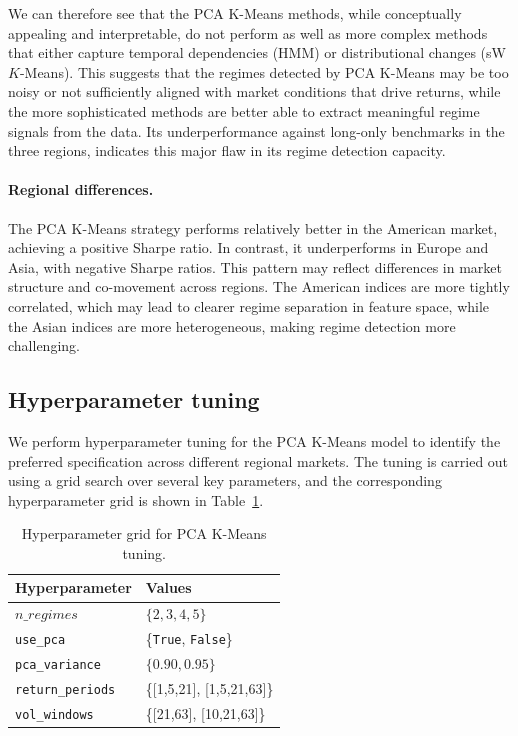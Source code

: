 \documentclass[11pt, a4paper]{article}
\begin{document}
We can therefore see that the PCA K-Means methods, while conceptually appealing and interpretable, do not perform as well as more complex methods that either capture temporal dependencies (HMM) or distributional changes (sW$K$-Means). This suggests that the regimes detected by PCA K-Means may be too noisy or not sufficiently aligned with market conditions that drive returns, while the more sophisticated methods are better able to extract meaningful regime signals from the data.
Its underperformance against long-only benchmarks in the three regions, indicates this major flaw in its regime detection capacity. 

\paragraph{Regional differences.}
The PCA K-Means strategy performs relatively better in the American market, achieving a positive Sharpe ratio. In contrast, it underperforms in Europe and Asia, with negative Sharpe ratios. This pattern may reflect differences in market structure and co-movement across regions. The American indices are more tightly correlated, which may lead to clearer regime separation in feature space, while the Asian indices are more heterogeneous, making regime detection more challenging.


\subsection{Hyperparameter tuning}
We perform hyperparameter tuning for the PCA K-Means model to identify the preferred specification across different regional markets.
The tuning is carried out using a grid search over several key parameters, and the corresponding hyperparameter grid is shown in Table~\ref{tab:tuning_grid}.
\begin{table}[h]
\centering
\caption{Hyperparameter grid for PCA K-Means tuning.}
\begin{tabular}{ll}
\hline
Hyperparameter & Values \\
\hline
$n\_regimes$ & $\{2,3,4,5\}$ \\
\texttt{use\_pca} & \{\texttt{True}, \texttt{False}\} \\
\texttt{pca\_variance} & $\{0.90, 0.95\}$ \\
\texttt{return\_periods} & \{[1,5,21], [1,5,21,63]\} \\
\texttt{vol\_windows} & \{[21,63], [10,21,63]\} \\
\hline
\end{tabular}
\label{tab:tuning_grid}
\end{table}
\end{document}
